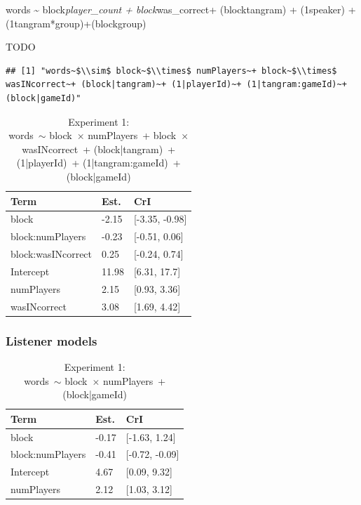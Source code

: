 \documentclass[
  english,
  a4paper,
]{article}
\begin{document}
words \textasciitilde{} block\emph{player\_count + block}was\_correct+ (block\textbar tangram) + (1\textbar speaker)
+ (1\textbar tangram*group)+(block\textbar group)

TODO

\begin{verbatim}
## [1] "words~$\\sim$ block~$\\times$ numPlayers~+ block~$\\times$ wasINcorrect~+ (block|tangram)~+ (1|playerId)~+ (1|tangram:gameId)~+ (block|gameId)"
\end{verbatim}

\begin{table}[h!]

\caption{\label{tab:unnamed-chunk-13}Experiment 1:\\ words~$\sim$ block~$\times$ numPlayers~+ block~$\times$ wasINcorrect~+ (block|tangram)~+ (1|playerId)~+ (1|tangram:gameId)~+ (block|gameId)}
\centering
\begin{tabular}[t]{lll}
\toprule
Term & Est. & CrI\\
\midrule
block & -2.15 & {}[-3.35, -0.98]\\
block:numPlayers & -0.23 & {}[-0.51, 0.06]\\
block:wasINcorrect & 0.25 & {}[-0.24, 0.74]\\
Intercept & 11.98 & {}[6.31, 17.7]\\
numPlayers & 2.15 & {}[0.93, 3.36]\\
\addlinespace
wasINcorrect & 3.08 & {}[1.69, 4.42]\\
\bottomrule
\end{tabular}
\end{table}

\hypertarget{listener-models}{%
\subsubsection{Listener models}\label{listener-models}}

\begin{table}[h!]

\caption{\label{tab:unnamed-chunk-14}Experiment 1:\\ words~$\sim$ block~$\times$ numPlayers~+ (block|gameId)}
\centering
\begin{tabular}[t]{lll}
\toprule
Term & Est. & CrI\\
\midrule
block & -0.17 & {}[-1.63, 1.24]\\
block:numPlayers & -0.41 & {}[-0.72, -0.09]\\
Intercept & 4.67 & {}[0.09, 9.32]\\
numPlayers & 2.12 & {}[1.03, 3.12]\\
\bottomrule
\end{tabular}
\end{table}
\end{document}
